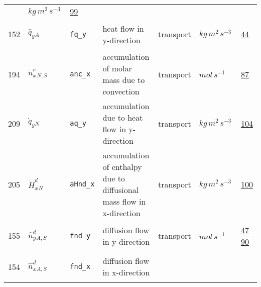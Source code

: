 \begin{longtable}{|p{1cm}|p{2.5cm}|p{4.5cm}|p{8cm}|p{3.0cm}|p{3cm}|p{1cm}|}
             & $ kg \,m^{2} \,s^{-3} \, $
             &                 \hyperlink{"e:99"}{ 99 }
                 \\
            152
             & \hypertarget{"v:152"}{ $ {{\hat{q}_y}}{_{A}} $}
             & \verb|fq_y|
             & heat flow in y-direction
             & \begin{lay}transport \end{lay}
             & $ kg \,m^{2} \,s^{-3} \, $
             &                 \hyperlink{"e:44"}{ 44 }
                 \\
            194
             & \hypertarget{"v:194"}{ $ {{\dot{n}^c_x}}{_{N, S}} $}
             & \verb|anc_x|
             & accumulation of molar mass due to convection
             & \begin{lay}transport \end{lay}
             & $ mol \,s^{-1} \, $
             &                 \hyperlink{"e:87"}{ 87 }
                 \\
            209
             & \hypertarget{"v:209"}{ $ {{\dot{q}_y}}{_{N}} $}
             & \verb|aq_y|
             & accumulation due to heat flow in y-direction
             & \begin{lay}transport \end{lay}
             & $ kg \,m^{2} \,s^{-3} \, $
             &                 \hyperlink{"e:104"}{ 104 }
                 \\
            205
             & \hypertarget{"v:205"}{ $ {{\dot{H}^d_x}}{_{N}} $}
             & \verb|aHnd_x|
             & accumulation of enthalpy due to diffusional mass flow in x-direction
             & \begin{lay}transport \end{lay}
             & $ kg \,m^{2} \,s^{-3} \, $
             &                 \hyperlink{"e:100"}{ 100 }
                 \\
            155
             & \hypertarget{"v:155"}{ $ {{\hat{n}^{d}_y}}{_{A, S}} $}
             & \verb|fnd_y|
             & diffusion flow in y-direction
             & \begin{lay}transport \end{lay}
             & $ mol \,s^{-1} \, $
             &                 \hyperlink{"e:47"}{ 47 }
                                 \hyperlink{"e:90"}{ 90 }
                 \\
            154
             & \hypertarget{"v:154"}{ $ {{\hat{n}^{d}_x}}{_{A, S}} $}
             & \verb|fnd_x|
             & diffusion flow in x-direction

\end{longtable}
